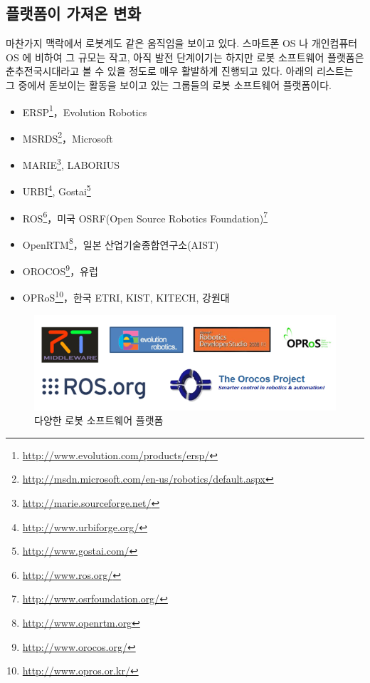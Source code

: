 \subsection{플랫폼이 가져온 변화}

마찬가지 맥락에서 로봇계도 같은 움직임을 보이고 있다. 스마트폰 OS 나 개인컴퓨터 OS 에 비하여 그 규모는 작고, 아직 발전 단계이기는 하지만 로봇 소프트웨어 플랫폼은 춘추전국시대라고 볼 수 있을 정도로 매우 활발하게 진행되고 있다.
아래의 리스트는 그 중에서 돋보이는 활동을 보이고 있는 그룹들의 로봇 소프트웨어 플랫폼이다.

\newpage

\begin{itemize}
\item ERSP\footnote{\url{http://www.evolution.com/products/ersp/}}，Evolution Robotics
\item MSRDS\footnote{\url{http://msdn.microsoft.com/en-us/robotics/default.aspx}}，Microsoft
\item MARIE\footnote{\url{http://marie.sourceforge.net/}}, LABORIUS
\item URBI\footnote{\url{http://www.urbiforge.org/}}, Gostai\footnote{\url{http://www.gostai.com/}}
\item ROS\footnote{\url{http://www.ros.org/}}，미국 OSRF(Open Source Robotics Foundation)\footnote{\url{http://www.osrfoundation.org/}}
\item OpenRTM\footnote{\url{http://www.openrtm.org}}，일본 산업기술종합연구소(AIST)
\item OROCOS\footnote{\url{http://www.orocos.org/}}，유럽
\item OPRoS\footnote{\url{http://www.opros.or.kr/}}，한국 ETRI, KIST, KITECH, 강원대
\end{itemize}

\begin{figure}[h]
\centering\includegraphics[width=\columnwidth]{pictures/chapter1/robotplatforms.png}
\caption{다양한 로봇 소프트웨어 플랫폼}
\end{figure}


